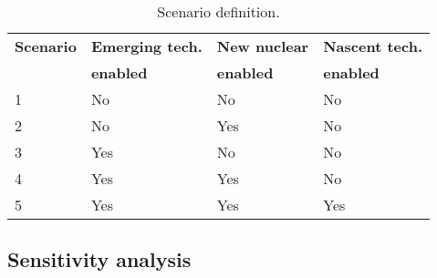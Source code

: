 \begin{table}[!ht]
	\caption{Scenario definition.}
	\vspace{0.1in}
	\begin{tabularx}{\textwidth}{p{} p{} p{} p{}}
\hline 
\textbf{Scenario}& \textbf{Emerging tech.} & \textbf{New nuclear} & \textbf{Nascent tech.}\\
                 & \textbf{enabled} & \textbf{enabled} & \textbf{enabled}\\
                  \hline
1               &  No       &         No     &     No  \\ 
2               &   No       &      Yes     &     No  \\ 
3               &   Yes     &         No      &     No   \\
4               &   Yes     &      Yes     &     No  \\ 
5               &   Yes     &      Yes     &     Yes  \\ 
\hline
	\end{tabularx}
\label{scen-table}
\end{table}



\subsection{Sensitivity analysis}

